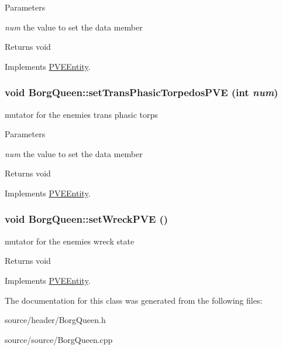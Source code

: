 \begin{DoxyParams}{Parameters}
\item[{\em num}]the value to set the data member\end{DoxyParams}
\begin{DoxyReturn}{Returns}
void 
\end{DoxyReturn}


Implements \hyperlink{classPVEEntity}{PVEEntity}.

\hypertarget{classBorgQueen_a7533de67e36cdd6ed501c71f0ce1867f}{
\subsubsection[{setTransPhasicTorpedosPVE}]{\setlength{\rightskip}{0pt plus 5cm}void BorgQueen::setTransPhasicTorpedosPVE (int {\em num})}}
\label{d6/d8d/classBorgQueen_a7533de67e36cdd6ed501c71f0ce1867f}
mutator for the enemies trans phasic torps


\begin{DoxyParams}{Parameters}
\item[{\em num}]the value to set the data member\end{DoxyParams}
\begin{DoxyReturn}{Returns}
void 
\end{DoxyReturn}


Implements \hyperlink{classPVEEntity}{PVEEntity}.

\hypertarget{classBorgQueen_a9f508246423f214a0c585ee914d4fb96}{
\subsubsection[{setWreckPVE}]{\setlength{\rightskip}{0pt plus 5cm}void BorgQueen::setWreckPVE ()}}
\label{d6/d8d/classBorgQueen_a9f508246423f214a0c585ee914d4fb96}
mutator for the enemies wreck state

\begin{DoxyReturn}{Returns}
void 
\end{DoxyReturn}


Implements \hyperlink{classPVEEntity}{PVEEntity}.



The documentation for this class was generated from the following files:\begin{DoxyCompactItemize}
\item 
source/header/BorgQueen.h\item 
source/source/BorgQueen.cpp\end{DoxyCompactItemize}
